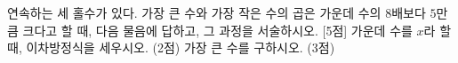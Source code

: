 연속하는 세 홀수가 있다. 가장 큰 수와 가장 작은 수의 곱은 가운데 수의 $8$배보다 $5$만큼 크다고 할 때, 다음 물음에 답하고, 그 과정을 서술하시오. \mbox{[5점]}
 가운데 수를 $x$라 할 때, 이차방정식을 세우시오. (2점)
 가장 큰 수를 구하시오. (3점)

